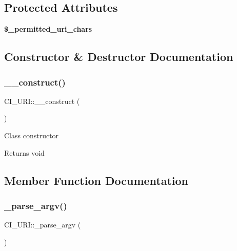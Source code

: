 \subsection*{Protected Attributes}
\begin{DoxyCompactItemize}
\item 
\mbox{\label{class_c_i___u_r_i_a8824adba0c88f6c5ec8540cb2a286726}} 
{\bfseries \$\+\_\+permitted\+\_\+uri\+\_\+chars}
\end{DoxyCompactItemize}


\subsection{Constructor \& Destructor Documentation}
\mbox{\label{class_c_i___u_r_i_a1bb0e2e643b4e161e6cb621de57f2e8a}} 
\subsubsection{\texorpdfstring{\+\_\+\+\_\+construct()}{\_\_construct()}}
{\footnotesize\ttfamily C\+I\+\_\+\+U\+R\+I\+::\+\_\+\+\_\+construct (\begin{DoxyParamCaption}{ }\end{DoxyParamCaption})}

Class constructor

\begin{DoxyReturn}{Returns}
void 
\end{DoxyReturn}


\subsection{Member Function Documentation}
\mbox{\label{class_c_i___u_r_i_a2d43a803a6b03667723786fc115a9bac}} 
\subsubsection{\texorpdfstring{\+\_\+parse\+\_\+argv()}{\_parse\_argv()}}
{\footnotesize\ttfamily C\+I\+\_\+\+U\+R\+I\+::\+\_\+parse\+\_\+argv (\begin{DoxyParamCaption}{ }\end{DoxyParamCaption})\hspace{0.3cm}{\ttfamily [protected]}}

